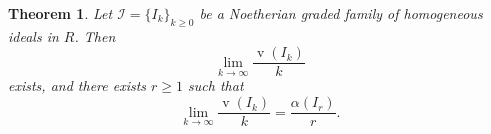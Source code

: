 \documentclass[11pt,reqno,a4paper]{amsart}
\newtheorem{theorem}{Theorem}[section]
\newtheorem{lemma}[theorem]{Lemma}
\theoremstyle{definition}
\begin{document}

\begin{theorem}\label{Proposition 1.4}
Let \(\mathcal{I} = \{I_k\}_{k \geq 0}\) be a Noetherian graded family of homogeneous ideals in  \(R\). Then
\[
\lim_{k \to \infty} \frac{\operatorname{v}(I_k)}{k}
\]
exists, and there exists \(r \geq 1\) such that
\[
\lim_{k \to \infty} \frac{\operatorname{v}(I_k)}{k} = \frac{\alpha(I_r)}{r}.\]
\end{theorem}
\end{document}
